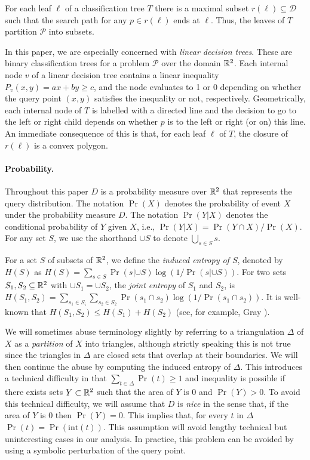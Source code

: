\documentclass[lotsofwhite]{patmorin}
\newcommand{\interior}{\mathrm{int}}
\begin{document}
For each leaf $\ell$ of a classification tree $T$ there is a maximal
subset $r(\ell)\subseteq \mathcal{D}$ such that the search path for
any $p\in r(\ell)$ ends at $\ell$.  Thus, the leaves of $T$ partition
$\mathcal{P}$ into subsets.

In this paper, we are especially concerned with \emph{linear decision
trees}. These are binary classification trees for a problem
$\mathcal{P}$ over the domain $\mathbb{R}^2$.  Each internal node $v$ of a
linear decision tree contains a linear inequality $P_v(x,y)=ax+by \ge
c$, and the node evaluates to 1 or 0 depending on whether the query
point $(x,y)$ satisfies the inequality or not, respectively.
Geometrically, each internal node of $T$ is labelled with a directed
line and the decision to go to the left or right child depends on
whether $p$ is to the left or right (or on) this line.  An immediate
consequence of this is that, for each leaf $\ell$ of $T$, the closure
of $r(\ell)$ is a convex polygon. 

\paragraph{Probability.}

Throughout this paper $D$ is a probability measure over $\mathbb{R}^2$ that
represents the query distribution.  The notation $\Pr(X)$ denotes the
probability of event $X$ under the probability measure $D$.  The
notation $\Pr(Y|X)$ denotes the conditional probability of $Y$ given
$X$, i.e., $\Pr(Y|X)=\Pr(Y\cap X)/\Pr(X)$.  For any set $S$, we use
the shorthand $\cup S$ to denote $\bigcup_{s\in S} s$.

For a set $S$ of subsets of $\mathbb{R}^2$, we define the \emph{induced
entropy of $S$}, denoted by $H(S)$ as $H(S)=\sum_{s\in S}\Pr(s|{\cup
S})\log(1/\Pr(s|{\cup S}))$.  For two sets $S_1,S_2\subseteq\mathbb{R}^2$ with
$\cup S_1=\cup S_2$, the \emph{joint entropy} of $S_1$ and $S_2$, is
$H(S_1,S_2) = \sum_{s_1\in S_i}\sum_{s_2\in S_2} \Pr(s_1\cap
s_2)\log(1/\Pr(s_1\cap s_2))$.  It is well-known that $H(S_1,S_2)\le
H(S_1)+H(S_2)$ (see, for example, Gray \cite[Lemma~2.3.2]{g08}).

We will sometimes abuse terminology slightly by referring to a
triangulation $\Delta$ of $X$ as a \emph{partition} of $X$ into
triangles, although strictly speaking this is not true since the
triangles in $\Delta$ are closed sets that overlap at their
boundaries.  We will then continue the abuse by computing the induced 
entropy of $\Delta$.
This introduces a technical difficulty in that
$\sum_{t\in\Delta}\Pr(t)\ge 1$ and inequality is possible if there
exists sets $Y\subset \mathbb{R}^2$ such that the area of $Y$ is 0 and
$\Pr(Y)>0$.  To avoid this technical difficulty, we will assume that
$D$ is \emph{nice} in the sense that, if the area of $Y$ is 0 then
$\Pr(Y)=0$.   This implies that, for every $t$ in $\Delta$ $\Pr(t) =
\Pr(\interior(t))$.  This assumption will avoid lengthy technical but
uninteresting cases in our analysis.  In practice, this problem can
be avoided by using a symbolic perturbation of the query point.
\end{document}
